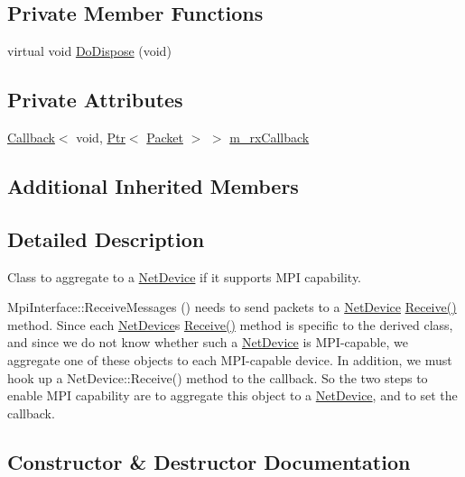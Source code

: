\subsection*{Private Member Functions}
\begin{DoxyCompactItemize}
\item 
virtual void \hyperlink{classns3_1_1MpiReceiver_a7a39273775deee65968f805e53f6790c}{Do\+Dispose} (void)
\end{DoxyCompactItemize}
\subsection*{Private Attributes}
\begin{DoxyCompactItemize}
\item 
\hyperlink{classns3_1_1Callback}{Callback}$<$ void, \hyperlink{classns3_1_1Ptr}{Ptr}$<$ \hyperlink{classns3_1_1Packet}{Packet} $>$ $>$ \hyperlink{classns3_1_1MpiReceiver_a03d6666dce90cf48f9fd5dff62fc6ca1}{m\+\_\+rx\+Callback}
\end{DoxyCompactItemize}
\subsection*{Additional Inherited Members}


\subsection{Detailed Description}
Class to aggregate to a \hyperlink{classns3_1_1NetDevice}{Net\+Device} if it supports M\+PI capability. 

Mpi\+Interface\+::\+Receive\+Messages () needs to send packets to a \hyperlink{classns3_1_1NetDevice}{Net\+Device} \hyperlink{classns3_1_1MpiReceiver_a5c5506ca706198f61eaa2e550eca7ff3}{Receive()} method. Since each \hyperlink{classns3_1_1NetDevice}{Net\+Device}\textquotesingle{}s \hyperlink{classns3_1_1MpiReceiver_a5c5506ca706198f61eaa2e550eca7ff3}{Receive()} method is specific to the derived class, and since we do not know whether such a \hyperlink{classns3_1_1NetDevice}{Net\+Device} is M\+P\+I-\/capable, we aggregate one of these objects to each M\+P\+I-\/capable device. In addition, we must hook up a Net\+Device\+::\+Receive() method to the callback. So the two steps to enable M\+PI capability are to aggregate this object to a \hyperlink{classns3_1_1NetDevice}{Net\+Device}, and to set the callback. 

\subsection{Constructor \& Destructor Documentation}
